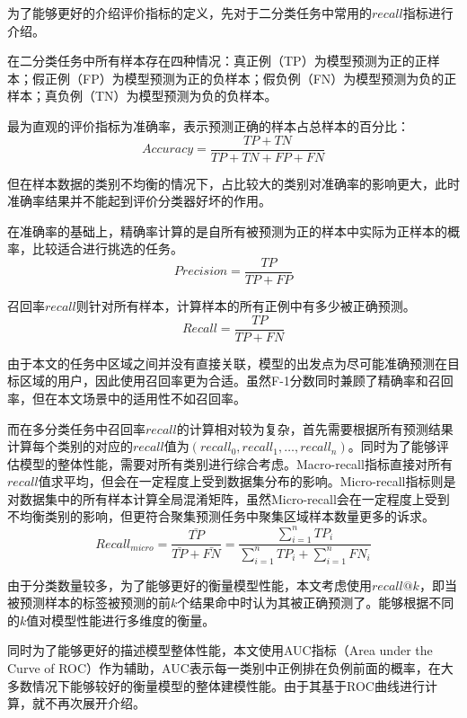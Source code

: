\documentclass[master]{thesis-uestc}
\begin{document}
为了能够更好的介绍评价指标的定义，先对于二分类任务中常用的$recall$指标进行介绍。

在二分类任务中所有样本存在四种情况：真正例（TP）为模型预测为正的正样本；假正例（FP）为模型预测为正的负样本；假负例（FN）为模型预测为负的正样本；真负例（TN）为模型预测为负的负样本。

最为直观的评价指标为准确率，表示预测正确的样本占总样本的百分比：
\begin{equation}
   Accuracy=\frac{TP+TN}{TP+TN+FP+FN}
\end{equation}

但在样本数据的类别不均衡的情况下，占比较大的类别对准确率的影响更大，此时准确率结果并不能起到评价分类器好坏的作用。

在准确率的基础上，精确率计算的是自所有被预测为正的样本中实际为正样本的概率，比较适合进行挑选的任务。
\begin{equation}
   Precision=\frac{TP}{TP+FP}
\end{equation}

召回率$recall$则针对所有样本，计算样本的所有正例中有多少被正确预测。
\begin{equation}
   Recall=\frac{TP}{TP+FN}
\end{equation}

由于本文的任务中区域之间并没有直接关联，模型的出发点为尽可能准确预测在目标区域的用户，因此使用召回率更为合适。虽然F-1分数同时兼顾了精确率和召回率，但在本文场景中的适用性不如召回率。

而在多分类任务中召回率$recall$的计算相对较为复杂，首先需要根据所有预测结果计算每个类别的对应的$recall$值为$(recall_0,recall_1,\dots,recall_n)$。同时为了能够评估模型的整体性能，需要对所有类别进行综合考虑。Macro-recall指标直接对所有$recall$值求平均，但会在一定程度上受到数据集分布的影响。Micro-recall指标则是对数据集中的所有样本计算全局混淆矩阵，虽然Micro-recall会在一定程度上受到不均衡类别的影响，但更符合聚集预测任务中聚集区域样本数量更多的诉求。
\begin{equation}
   Recall_{micro}=\frac{\bar{TP}}{\bar{TP}+\bar{FN}} = \frac{\sum_{i=1}^n TP_i}{\sum_{i=1}^n TP_i+\sum_{i=1}^n FN_i}
\end{equation}

由于分类数量较多，为了能够更好的衡量模型性能，本文考虑使用$recall@k$，即当被预测样本的标签被预测的前$k$个结果命中时认为其被正确预测了。能够根据不同的$k$值对模型性能进行多维度的衡量。

同时为了能够更好的描述模型整体性能，本文使用AUC指标（Area under the Curve of ROC）作为辅助，AUC表示每一类别中正例排在负例前面的概率，在大多数情况下能够较好的衡量模型的整体建模性能。由于其基于ROC曲线进行计算，就不再次展开介绍。
\end{document}
